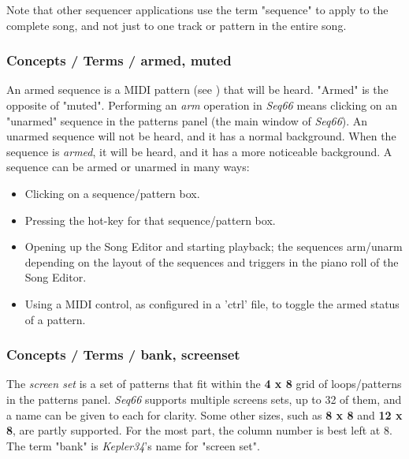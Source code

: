    Note that other sequencer applications use the term "sequence"
   to apply to the complete song, and not just to one track or pattern in the
   entire song.

\subsubsection{Concepts / Terms / armed, muted}
\label{subsubsec:concepts_terms_armed}

   An armed sequence is a MIDI pattern
   (see )
   that will be heard.
   "Armed" is the opposite of "muted".
   Performing an \textsl{arm} operation in \textsl{Seq66}
   means clicking on an "unarmed" sequence in the patterns panel (the main
   window of \textsl{Seq66}).
   An unarmed sequence will not be heard, and it has a normal background.
   When the sequence is \textsl{armed}, it will be heard, and it has a
   more noticeable  background.
   A sequence can be armed or unarmed in many ways:

   \begin{itemize}
      \item Clicking on a sequence/pattern box.
      \item Pressing the hot-key for that sequence/pattern box.
      \item Opening up the Song Editor and starting playback; the
         sequences arm/unarm depending on the layout of the
         sequences and triggers in the piano roll of the Song Editor.
      \item Using a MIDI control, as configured in a 'ctrl' file, to
         toggle the armed status of a pattern.
   \end{itemize}

\subsubsection{Concepts / Terms / bank, screenset}
\label{subsubsec:concepts_terms_bank}

   The \textsl{screen set}
   is a set of patterns that fit within the \textbf{4 x 8}
   grid of loops/patterns in the patterns panel.
   \textsl{Seq66} supports multiple screens sets, up to 32 of them,
   and a name can be given to each for clarity.
   Some other sizes, such as \textbf{8 x 8} and \textbf{12 x 8}, are
   partly supported.  For the most part, the column number is best left at 8.
   The term "bank" is \textsl{Kepler34}'s name for "screen set".

